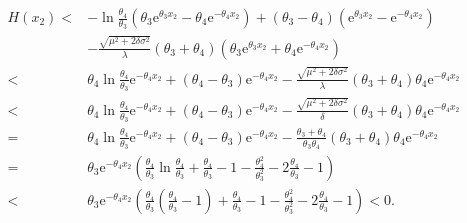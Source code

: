 \documentclass[11pt,reqno]{article}%
\numberwithin{equation}{section}
\begin{document}
\begin{equation}\nonumber
\begin{aligned}
H(x_2)<&-\ln{\frac{\theta_{4}}{\theta_{3}}}\left(\theta_{3} \mathrm{e}^{\theta_{3}x_2}-\theta_{4}\mathrm{e}^{-\theta_{4}x_2}\right)+(\theta_3-\theta_4)\left(\mathrm{e}^{\theta_{3}x_2}-\mathrm{e}^{-\theta_{4}x_2}\right)\\&-\frac{\sqrt{\mu^2 + 2 \delta \sigma^2}}{\lambda }(\theta_3+\theta_4)\left(\theta_{3} \mathrm{e}^{\theta_{3}x_2}+\theta_{4}\mathrm{e}^{-\theta_{4}x_2}\right)\\
<& \theta_4\ln{\frac{\theta_{4}}{\theta_{3}}}\mathrm{e}^{-\theta_{4}x_2}+(\theta_4-\theta_3)\mathrm{e}^{-\theta_{4}x_2}-\frac{\sqrt{\mu^2 + 2 \delta \sigma^2}}{\lambda }(\theta_3+\theta_4)\theta_{4}\mathrm{e}^{-\theta_{4}x_2}\\
<&\theta_4\ln{\frac{\theta_{4}}{\theta_{3}}}\mathrm{e}^{-\theta_{4}x_2}+(\theta_4-\theta_3)\mathrm{e}^{-\theta_{4}x_2}-\frac{\sqrt{\mu^2 + 2 \delta \sigma^2}}{\delta }(\theta_3+\theta_4)\theta_{4}\mathrm{e}^{-\theta_{4}x_2}\\
=&\theta_4\ln{\frac{\theta_{4}}{\theta_{3}}}\mathrm{e}^{-\theta_{4}x_2}+(\theta_4-\theta_3)\mathrm{e}^{-\theta_{4}x_2}-\frac{\theta_3+\theta_4}{\theta_3\theta_4}(\theta_3+\theta_4)\theta_{4}\mathrm{e}^{-\theta_{4}x_2}\\
=&\theta_3\mathrm{e}^{-\theta_{4}x_2}\left(\frac{\theta_{4}}{\theta_{3}}\ln{\frac{\theta_{4}}{\theta_{3}}}+\frac{\theta_{4}}{\theta_{3}}-1-\frac{\theta_{4}^2}{\theta_{3}^2}-2\frac{\theta_{4}}{\theta_{3}}-1\right)\\
<&\theta_3\mathrm{e}^{-\theta_{4}x_2}\left(\frac{\theta_{4}}{\theta_{3}}\left(\frac{\theta_{4}}{\theta_{3}}-1\right)+\frac{\theta_{4}}{\theta_{3}}-1-\frac{\theta_{4}^2}{\theta_{3}^2}-2\frac{\theta_{4}}{\theta_{3}}-1\right)<0.\end{aligned}
\end{equation}
\end{document}

